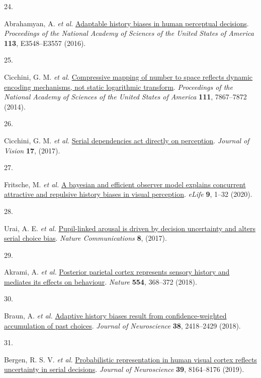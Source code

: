 \documentclass[
]{article}
\newlength{\cslhangindent}
\newlength{\csllabelwidth}
\newlength{\cslentryspacingunit} %
\newenvironment{CSLReferences}[2] %
 {%
  \setlength{\parindent}{0pt}
  \ifodd #1
  \let\oldpar\par
  \def\par{\hangindent=\cslhangindent\oldpar}
  \fi
  \setlength{\parskip}{#2\cslentryspacingunit}
 }%
 {}
\newcommand{\CSLLeftMargin}[1]{\parbox[t]{\csllabelwidth}{#1}}
\newcommand{\CSLRightInline}[1]{\parbox[t]{\linewidth - \csllabelwidth}{#1}\break}
\begin{document}
\begin{CSLReferences}{0}{0}
\leavevmode{}%
\CSLLeftMargin{24. }%
\CSLRightInline{Abrahamyan, A. \emph{et al.}
\href{https://doi.org/10.1073/pnas.1518786113}{{Adaptable history biases
in human perceptual decisions}}. \emph{Proceedings of the National
Academy of Sciences of the United States of America} \textbf{113},
E3548--E3557 (2016).}

\leavevmode{}%
\CSLLeftMargin{25. }%
\CSLRightInline{Cicchini, G. M. \emph{et al.}
\href{https://doi.org/10.1073/pnas.1402785111}{{Compressive mapping of
number to space reflects dynamic encoding mechanisms, not static
logarithmic transform}}. \emph{Proceedings of the National Academy of
Sciences of the United States of America} \textbf{111}, 7867--7872
(2014).}

\leavevmode{}%
\CSLLeftMargin{26. }%
\CSLRightInline{Cicchini, G. M. \emph{et al.}
\href{https://doi.org/10.1167/17.14.6}{{Serial dependencies act directly
on perception}}. \emph{Journal of Vision} \textbf{17}, (2017).}

\leavevmode{}%
\CSLLeftMargin{27. }%
\CSLRightInline{Fritsche, M. \emph{et al.}
\href{https://doi.org/10.7554/eLife.55389}{{A bayesian and efficient
observer model explains concurrent attractive and repulsive history
biases in visual perception}}. \emph{eLife} \textbf{9}, 1--32 (2020).}

\leavevmode{}%
\CSLLeftMargin{28. }%
\CSLRightInline{Urai, A. E. \emph{et al.}
\href{https://doi.org/10.1038/ncomms14637}{{Pupil-linked arousal is
driven by decision uncertainty and alters serial choice bias}}.
\emph{Nature Communications} \textbf{8}, (2017).}

\leavevmode{}%
\CSLLeftMargin{29. }%
\CSLRightInline{Akrami, A. \emph{et al.}
\href{https://doi.org/10.1038/nature25510}{{Posterior parietal cortex
represents sensory history and mediates its effects on behaviour}}.
\emph{Nature} \textbf{554}, 368--372 (2018).}

\leavevmode{}%
\CSLLeftMargin{30. }%
\CSLRightInline{Braun, A. \emph{et al.}
\href{https://doi.org/10.1523/JNEUROSCI.2189-17.2017}{{Adaptive history
biases result from confidence-weighted accumulation of past choices}}.
\emph{Journal of Neuroscience} \textbf{38}, 2418--2429 (2018).}

\leavevmode{}%
\CSLLeftMargin{31. }%
\CSLRightInline{Bergen, R. S. V. \emph{et al.}
\href{https://doi.org/10.1523/JNEUROSCI.3212-18.2019}{{Probabilistic
representation in human visual cortex reflects uncertainty in serial
decisions}}. \emph{Journal of Neuroscience} \textbf{39}, 8164--8176
(2019).}


\end{CSLReferences}
\end{document}
